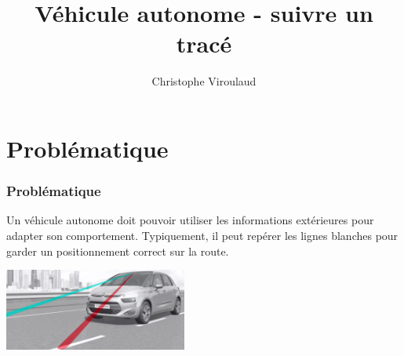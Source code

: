 \documentclass[svgnames,11pt]{beamer}
\author[]{Christophe Viroulaud}
\title{Véhicule autonome - suivre un tracé}
\date{}
\institute{Seconde SNT}
\begin{document}
\begin{frame}
\titlepage
\end{frame}

\section{Problématique}
\begin{frame}
    \frametitle{Problématique}

    Un véhicule autonome doit pouvoir utiliser les informations extérieures pour adapter son comportement. Typiquement, il peut repérer les lignes blanches pour garder un positionnement correct sur la route.
\begin{center}
\centering
\includegraphics[width=6cm]{ressources/lignes.png}
\label{lignes}
\end{center}

\end{frame}

\begin{frame}
    \frametitle{}

    \begin{center}
    \end{center}

\end{frame}
\end{document}
